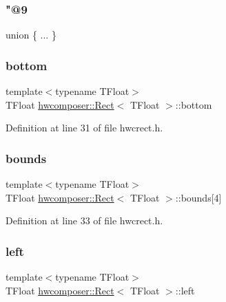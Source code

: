 \subsubsection{\texorpdfstring{"@9}{@9}}
{\footnotesize\ttfamily union \{ ... \} }

\mbox{\label{structhwcomposer_1_1Rect_ac93168730cfe6d9831ac79cc5bc1a222}} 
\subsubsection{\texorpdfstring{bottom}{bottom}}
{\footnotesize\ttfamily template$<$typename T\+Float$>$ \\
T\+Float \mbox{\hyperlink{structhwcomposer_1_1Rect}{hwcomposer\+::\+Rect}}$<$ T\+Float $>$\+::bottom}



Definition at line 31 of file hwcrect.\+h.

\mbox{\label{structhwcomposer_1_1Rect_abb44f7a323bfd859d5df4206ed2ed522}} 
\subsubsection{\texorpdfstring{bounds}{bounds}}
{\footnotesize\ttfamily template$<$typename T\+Float$>$ \\
T\+Float \mbox{\hyperlink{structhwcomposer_1_1Rect}{hwcomposer\+::\+Rect}}$<$ T\+Float $>$\+::bounds\mbox{[}4\mbox{]}}



Definition at line 33 of file hwcrect.\+h.

\mbox{\label{structhwcomposer_1_1Rect_a75263dbad1a165fae707a0b208358740}} 
\subsubsection{\texorpdfstring{left}{left}}
{\footnotesize\ttfamily template$<$typename T\+Float$>$ \\
T\+Float \mbox{\hyperlink{structhwcomposer_1_1Rect}{hwcomposer\+::\+Rect}}$<$ T\+Float $>$\+::left}



